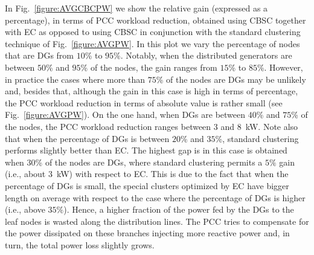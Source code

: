 \documentclass[journal]{IEEEtran}
\newcommand{\fig}[1]{Fig.~\ref{#1}}
\begin{document}
In \fig{figure:AVGCBCPW} we show the relative gain (expressed as a percentage), in terms of PCC workload reduction, obtained using CBSC together with EC as opposed to using CBSC in conjunction with the standard clustering technique of \fig{figure:AVGPW}. 
In this plot we vary the percentage of nodes that are DGs from $10$\% to $95$\%. Notably, when the distributed generators are between $50$\% and $95$\% of the nodes, the gain ranges from $15$\% to $85$\%. However, in practice the cases where more than $75$\% of the nodes are DGs may be unlikely and, besides that, although the gain in this case is high in terms of percentage, the PCC workload reduction in terms of absolute value is rather small (see \fig{figure:AVGPW}). On the one hand, when DGs are between $40$\% and $75$\% of the nodes, the PCC workload reduction ranges between $3$ and $8$~kW. Note also that when the percentage of DGs is between $20$\% and $35$\%, standard clustering performs slightly better than EC. The highest gap is in this case is obtained when $30$\% of the nodes are DGs, where standard clustering permits a $5\%$ gain (i.e., about $3$~kW) with respect to EC. This is due to the fact that when the percentage of DGs is small, the special clusters optimized by EC have bigger length on average with respect to the case where the percentage of DGs is higher (i.e., above $35\%$). Hence, a higher fraction of the power fed by the DGs to the leaf nodes is wasted along the distribution lines. The PCC tries to compensate for the power dissipated on these branches injecting more reactive power and, in turn, the total power loss slightly grows.
\end{document}
